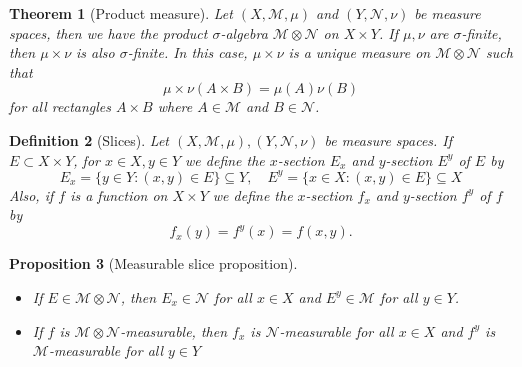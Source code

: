 \documentclass[11pt, letter]{book}
\newtheorem{theorem}{Theorem}[section]
\newtheorem{definition}[theorem]{Definition}
\newtheorem{proposition}[theorem]{Proposition}
\begin{document}
\begin{theorem}[Product measure]\label{thm:ProdMeasure}
Let $(X,\mathcal{M},\mu)$ and $(Y,\mathcal{N},\nu)$ be measure spaces, then we have the product $\sigma$-algebra $\mathcal{M}\otimes \mathcal{N}$ on $X\times Y$. If $\mu,\nu$ are $\sigma$-finite, then $\mu\times \nu$ is also $\sigma$-finite. In this case, $\mu\times \nu$ is a unique measure on $\mathcal{M}\otimes \mathcal{N}$ such that 
\begin{equation*}
    \mu \times \nu (A\times B) = \mu(A) \nu(B)
\end{equation*}
for all rectangles $A\times B$ where $A\in \mathcal{M}$ and $B\in \mathcal{N}$. 
\end{theorem}
\begin{definition}[Slices]
Let $(X,\mathcal{M},\mu),(Y,\mathcal{N},\nu)$ be measure spaces. If $E \subset X\times Y$, for $x\in X, y\in Y$ we define the $x$-section $E_x$ and $y$-section $E^y$ of $E$ by
\begin{equation*}
    E_x = \{y\in Y : (x,y)\in E \} \subseteq Y, \quad
    E^y = \{ x\in X: (x,y)\in E \} \subseteq X
\end{equation*}
Also, if $f$ is a function on $X\times Y$ we define the $x$-section $f_x$ and $y$-section $f^y$ of $f$ by 
\begin{equation*}
    f_x(y) = f^y(x) = f(x,y).
\end{equation*}
\end{definition}
\begin{proposition}[Measurable slice proposition]
$\,$
\begin{itemize}
    \item If $E \in \mathcal{M}\otimes \mathcal{N}$, then $E_x \in \mathcal{N}$ for all $x\in X$ and $E^y \in \mathcal{M}$ for all $y\in Y$. 
    
    \item If $f$ is $\mathcal{M}\otimes \mathcal{N}$-measurable, then $f_x$ is $\mathcal{N}$-measurable for all $x\in X$ and $f^y$ is $\mathcal{M}$-measurable for all $y\in Y$
\end{itemize}
\end{proposition}
\end{document}
